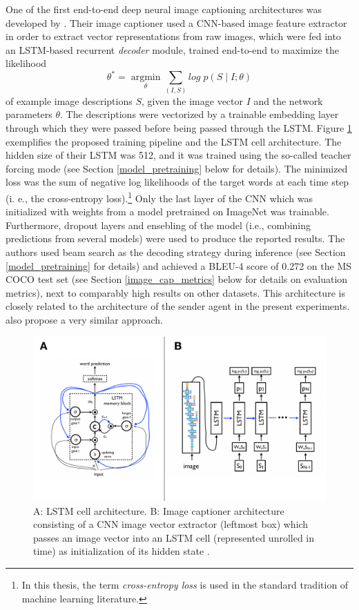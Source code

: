 One of the first end-to-end deep neural image captioning architectures was developed by \cite{vinyals2015show}. Their image captioner used a CNN-based image feature extractor in order to extract vector representations from raw images, which were fed into an LSTM-based recurrent \textit{decoder} module, trained end-to-end to maximize the likelihood 
\begin{equation}
\theta^* = \operatorname*{argmin}_\theta \sum_{(I, S)} log\; p(S \mid I; \theta) 
\end{equation}
of example image descriptions $S$, given the image vector $I$ and the network parameters $\theta$. The descriptions were vectorized by a trainable embedding layer through which they were passed before being passed through the LSTM. Figure \ref{fig:lstm} exemplifies the proposed training pipeline and the LSTM cell architecture. The hidden size of their LSTM was 512, and it was trained using the so-called teacher forcing mode (see Section \ref{model_pretraining} below for details). The minimized loss was the sum of negative log likelihoods of the target words at each time step (i. e., the cross-entropy loss).\footnote{In this thesis, the term \emph{cross-entropy loss} is used in the standard tradition of machine learning literature.} Only the last layer of the CNN which was initialized with weights from a model pretrained on ImageNet was trainable. Furthermore, dropout layers and ensebling of the model (i.e., combining predictions from several models) were used to produce the reported results. The authors used beam search as the decoding strategy during inference (see Section \ref{model_pretraining} for details) and achieved a BLEU-4 score of 0.272 on the MS COCO test set (see Section \ref{image_cap_metrics} below for details on evaluation metrics), next to comparably high results on other datasets. 
This architecture is closely related to the architecture of the sender agent in the present experiments. \cite{donahue2015long} also propose a very similar approach.

\begin{figure}
	\centering
	\includegraphics[width=\linewidth]{images/vinyals_lstm.pdf}
	\caption{A: LSTM cell architecture. B: Image captioner architecture consisting of a CNN image vector extractor (leftmost box) which passes an image vector into an LSTM cell (represented unrolled in time) as initialization of its hidden state \parencite[][p. 2--3, Fig.~2--3]{vinyals2015show}.}
	\label{fig:lstm}
\end{figure}

